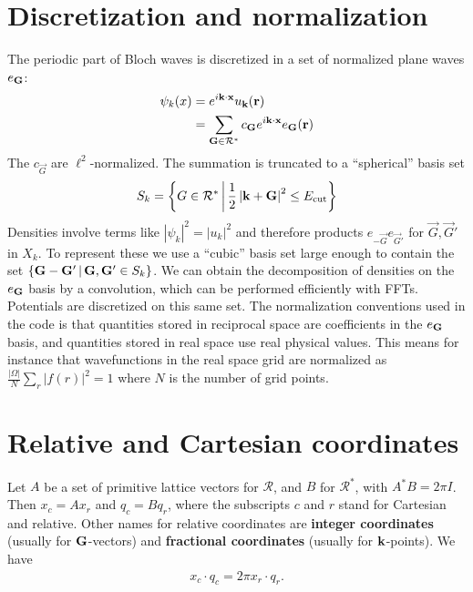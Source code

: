 \documentclass[a4paper]{article}
\begin{document}
\section{Discretization and normalization}
The periodic part of Bloch waves is discretized in a set of normalized
plane waves $e_{\mathbf{\mathbf{G}}}$:
\begin{align*}
  \psi_{k}(x) &= e^{i \mathbf{k} \cdot \mathbf{x}} u_{\mathbf{k}}(\mathbf{r})\\
  &= \sum_{\mathbf{\mathbf{G}} \in \mathcal R^{*}} c_{\mathbf{G}}  e^{i \mathbf{k} \cdot \mathbf{x}} e_{\mathbf{G}}(\mathbf{r})
\end{align*}
The $c_{\vec{G}}$ are $\ell^{2}$-normalized. The summation is truncated to a
``spherical'' basis set
\begin{align*}
  S_{k} = \left\{G \in \mathcal R^{*} \,\middle|\, \frac 1 2 \left\lvert\mathbf{k}+\mathbf{G}\right\rvert^{2} \le E_{\rm cut}\right\}
\end{align*}
Densities involve terms like $|\psi_{k}|^{2} = |u_{k}|^{2}$ and
therefore products $e_{-\vec{G}} e_{\vec{G}'}$ for $\vec{G}, \vec{G}'$ in $X_{k}$. To
represent these we use a ``cubic'' basis set large enough to contain
the set $\{\mathbf{G}-\mathbf{G}' \,|\, \mathbf{G}, \mathbf{G}' \in S_{k}\}$. We can obtain the decomposition
of densities on the $e_{\mathbf{G}}$ basis by a convolution, which can be
performed efficiently with FFTs. Potentials are discretized on this
same set. The normalization conventions used in the code is that
quantities stored in reciprocal space are coefficients in the $e_{\mathbf{G}}$
basis, and quantities stored in real space use real physical values.
This means for instance that wavefunctions in the real space grid are
normalized as $\frac{|\Omega|}{N} \sum_{r} |f(r)|^{2} = 1$ where $N$
is the number of grid points.

\section{Relative and Cartesian coordinates}
Let $A$ be a set of primitive lattice vectors for $\mathcal R$, and
$B$ for $\mathcal R^{*}$, with $A^{*} B = 2\pi I$. Then $x_{c} = A
x_{r}$ and $q_{c} = B q_{r}$, where the subscripts $c$ and $r$ stand
for Cartesian and relative. Other names for relative coordinates
are \textbf{integer coordinates} (usually for $\mathbf{G}$-vectors)
and \textbf{fractional coordinates}
(usually for $\mathbf{k}$-points). We have
\begin{align*}
  x_{c} \cdot q_{c} = 2\pi x_{r} \cdot q_{r}.
\end{align*}
\end{document}
